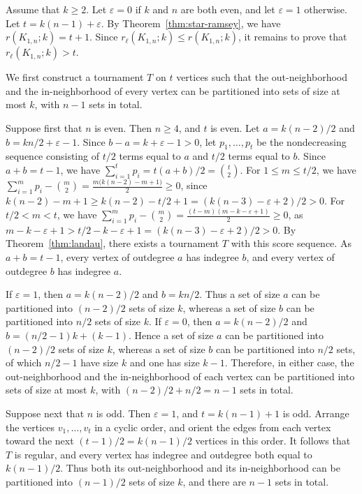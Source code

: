 \documentclass[11pt]{article}
\theoremstyle{definition}
\theoremstyle{remark}
\begin{document}
Assume that \(k\geq2\). Let \(\varepsilon=0\) if \(k\) and \(n\) are
both even, and let \(\varepsilon=1\) otherwise. Let
\(t=k(n-1)+\varepsilon\). By Theorem~\ref{thm:star-ramsey}, we have
\(r(K_{1,n};k)=t+1\). Since
\(r_{\ell}(K_{1,n};k)\leq r(K_{1,n};k)\), it remains to prove that
\(r_{\ell}(K_{1,n};k)>t\).

We first construct a tournament \(T\) on \(t\) vertices such that the
out-neighborhood and the in-neighborhood of every vertex can be
partitioned into sets of size at most \(k\), with \(n-1\) sets in
total.

Suppose first that \(n\) is even. Then \(n\geq4\), and \(t\) is even.
Let \(a=k(n-2)/2\) and \(b=kn/2+\varepsilon-1\). Since
\(b-a=k+\varepsilon-1>0\), let \(p_1,\ldots,p_t\) be the
nondecreasing sequence consisting of \(t/2\) terms equal to \(a\) and
\(t/2\) terms equal to \(b\). Since \(a+b=t-1\), we have
\(\sum_{i=1}^{t}p_i=t(a+b)/2=\binom{t}{2}\). For
\(1\leq m\leq t/2\), we have
\(\sum_{i=1}^{m}p_i-\binom{m}{2} =\frac{m\bigl(k(n-2)-m+1\bigr)}{2}\geq0\),
since
\(k(n-2)-m+1\geq k(n-2)-t/2+1
=(k(n-3)-\varepsilon+2)/2>0\). For \(t/2<m<t\), we have
\(\sum_{i=1}^{m}p_i-\binom{m}{2} =\frac{(t-m)(m-k-\varepsilon+1)}{2}\geq0\),
as
\(m-k-\varepsilon+1>t/2-k-\varepsilon+1
=(k(n-3)-\varepsilon+2)/2>0\). By
Theorem~\ref{thm:landau}, there exists a tournament \(T\) with this
score sequence. As \(a+b=t-1\), every vertex of outdegree \(a\) has
indegree \(b\), and every vertex of outdegree \(b\) has indegree \(a\).

If \(\varepsilon=1\), then \(a=k(n-2)/2\) and \(b=kn/2\). Thus a set
of size \(a\) can be partitioned into \((n-2)/2\) sets of size \(k\),
whereas a set of size \(b\) can be partitioned into \(n/2\) sets of
size \(k\). If \(\varepsilon=0\), then \(a=k(n-2)/2\) and
\(b=(n/2-1)k+(k-1)\). Hence a set of size \(a\) can be partitioned
into \((n-2)/2\) sets of size \(k\), whereas a set of size \(b\) can
be partitioned into \(n/2\) sets, of which \(n/2-1\) have size \(k\)
and one has size \(k-1\). Therefore, in either case, the
out-neighborhood and the in-neighborhood of each vertex can be
partitioned into sets of size at most \(k\), with
\((n-2)/2+n/2=n-1\) sets in total.

Suppose next that \(n\) is odd. Then \(\varepsilon=1\), and
\(t=k(n-1)+1\) is odd. Arrange the vertices \(v_1,\ldots,v_t\) in a
cyclic order, and orient the edges from each vertex toward the next
\((t-1)/2=k(n-1)/2\) vertices in this order. It follows that \(T\) is
regular, and every vertex has indegree and outdegree both equal to
\(k(n-1)/2\). Thus both its out-neighborhood and its in-neighborhood
can be partitioned into \((n-1)/2\) sets of size \(k\), and there are
\(n-1\) sets in total.
\end{document}

